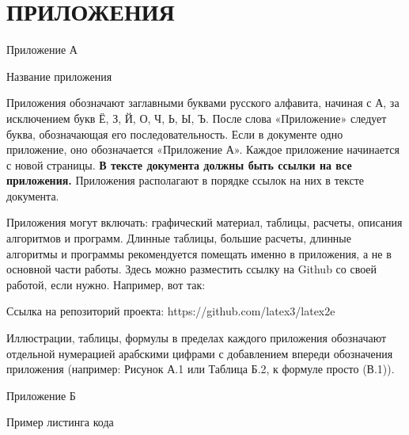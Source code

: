 \documentclass{report}
\begin{document}
\chapter*{ПРИЛОЖЕНИЯ}


\begin{flushright}
     Приложение А
\end{flushright}

\begin{center}  Название приложения \end{center}

Приложения обозначают заглавными буквами русского алфавита, начиная с А, за исключением букв Ё, З, Й, О, Ч, Ь, Ы, Ъ. После слова «Приложение» следует буква, обозначающая его последовательность.
Если в документе одно приложение, оно обозначается «Приложение А».
Каждое приложение начинается с новой страницы.
{\bf В тексте документа должны быть ссылки на все приложения.}  Приложения располагают в порядке ссылок на них в тексте документа.

Приложения могут включать: графический материал, таблицы, расчеты, описания алгоритмов и программ. Длинные таблицы, большие расчеты, длинные алгоритмы и программы рекомендуется помещать именно в приложения, а не в основной части работы. Здесь можно разместить ссылку на Github со своей работой, если нужно. Например, вот так:

Ссылка на репозиторий проекта: https://github.com/latex3/latex2e

Иллюстрации, таблицы, формулы в пределах каждого приложения обозначают отдельной нумерацией арабскими цифрами с добавлением впереди обозначения приложения (например: Рисунок А.1 или Таблица Б.2, к формуле просто (В.1)).
\newpage

\begin{flushright}
     Приложение Б
\end{flushright}

\begin{center}  Пример листинга кода \end{center}
\end{document}
